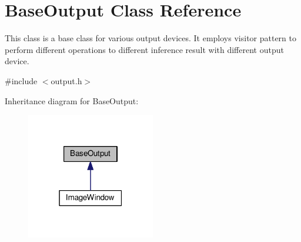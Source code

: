 \hypertarget{classBaseOutput}{}\section{Base\+Output Class Reference}
\label{classBaseOutput}


This class is a base class for various output devices. It employs visitor pattern to perform different operations to different inference result with different output device.  




{\ttfamily \#include $<$output.\+h$>$}



Inheritance diagram for Base\+Output\+:
\nopagebreak
\begin{figure}[H]
\begin{center}
\leavevmode
\includegraphics[width=159pt]{classBaseOutput__inherit__graph}
\end{center}
\end{figure}
